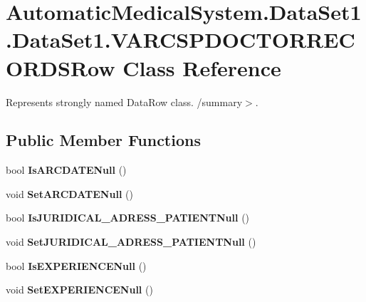 \section{AutomaticMedicalSystem.DataSet1.DataSet1.VARCSPDOCTORRECORDSRow Class Reference}
\label{class_automatic_medical_system_1_1_data_set1_1_1_v_a_r_c_s_p_d_o_c_t_o_r_r_e_c_o_r_d_s_row}
Represents strongly named DataRow class. /summary$>$.  


\subsection*{Public Member Functions}
\begin{CompactItemize}
\item 
bool \textbf{IsARCDATENull} ()\label{class_automatic_medical_system_1_1_data_set1_1_1_v_a_r_c_s_p_d_o_c_t_o_r_r_e_c_o_r_d_s_row_f7e757a6e7d00b2ee456c3a515ea1ba2}

\item 
void \textbf{SetARCDATENull} ()\label{class_automatic_medical_system_1_1_data_set1_1_1_v_a_r_c_s_p_d_o_c_t_o_r_r_e_c_o_r_d_s_row_c9730c88bd898a952fb32ef6fa8ac3c1}

\item 
bool \textbf{IsJURIDICAL\_\-ADRESS\_\-PATIENTNull} ()\label{class_automatic_medical_system_1_1_data_set1_1_1_v_a_r_c_s_p_d_o_c_t_o_r_r_e_c_o_r_d_s_row_7c80e24620f223fa7bc99974176389ad}

\item 
void \textbf{SetJURIDICAL\_\-ADRESS\_\-PATIENTNull} ()\label{class_automatic_medical_system_1_1_data_set1_1_1_v_a_r_c_s_p_d_o_c_t_o_r_r_e_c_o_r_d_s_row_55eb7b40953edba1fd0b870978f3d890}

\item 
bool \textbf{IsEXPERIENCENull} ()\label{class_automatic_medical_system_1_1_data_set1_1_1_v_a_r_c_s_p_d_o_c_t_o_r_r_e_c_o_r_d_s_row_c9220cb0c70a220f703648519251851f}

\item 
void \textbf{SetEXPERIENCENull} ()\label{class_automatic_medical_system_1_1_data_set1_1_1_v_a_r_c_s_p_d_o_c_t_o_r_r_e_c_o_r_d_s_row_d17a3c6c57c35c78138e9c35573c151e}

\end{CompactItemize}
